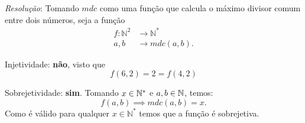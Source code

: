 \emph{Resolução}: Tomando $mdc$ como uma função que calcula o máximo divisor comum entre dois números, seja a função 
\begin{align*}
    f: \mathbb{N}^2 &\rightarrow \mathbb{N}^* \\
   a, b &\rightarrow mdc(a, b).
\end{align*} 
\par Injetividade: \textbf{não}, visto que 
    \begin{displaymath}
        f(6, 2) = 2 = f(4, 2)
    \end{displaymath}
\par Sobrejetividade: \textbf{sim}. Tomando $x \in \mathbb N^*$ e $a, b \in \mathbb N$, temos:
    \begin{displaymath}
        f(a, b) \implies mdc(a, b) = x.
    \end{displaymath}
    Como é válido para qualquer $x \in \mathbb{N}^*$ temos que a função é sobrejetiva.
